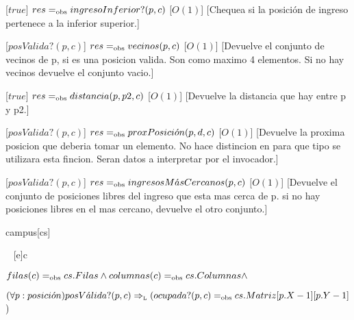 \begin{Interfaz}
  [$true$]
  {$res =_{\mathrm{obs}} ingresoInferior?(p,c)$}
  [$O(1)$]
  [Chequea si la posición de ingreso pertenece a la inferior superior.]
  
  [$posV\acute{a}lida?(p,c)$]
  {$res =_{\mathrm{obs}} vecinos(p,c)$}
  [$O(1)$]
  [Devuelve el conjunto de vecinos de p, si es una posicion valida. Son como maximo 4 elementos. Si no hay vecinos devuelve el conjunto vacio.]
  
  [$true$]
  {$res =_{\mathrm{obs}} distancia(p,p2,c)$}
  [$O(1)$]
  [Devuelve la distancia que hay entre p y p2.]

  [$posV\acute{a}lida?(p,c)$]
  {$res =_{\mathrm{obs}} proxPosici\acute{o}n(p,d,c)$}
  [$O(1)$]
  [Devuelve la proxima posicion que deberia tomar un elemento. No hace distincion en para que tipo se utilizara esta fincion. Seran datos a interpretar por el invocador.]
  
  [$posV\acute{a}lida?(p,c)$]
  {$res =_{\mathrm{obs}} ingresosM\acute{a}sCercanos(p,c)$}
  [$O(1)$]
  [Devuelve el conjunto de posiciones libres del ingreso que esta mas cerca de p. si no hay posiciones libres en el mas cercano, devuelve el otro conjunto.]

\end{Interfaz}

\begin{Representacion}


  \begin{Estructura}{campus}[cs]
    \begin{Tupla}[cs]
    \end{Tupla}
  \end{Estructura}

  \mbox{}
  ~
  [e]{c}{$filas(c) =_{\mathrm{obs}} cs.Filas \land columnas(c) =_{\mathrm{obs}} cs.Columnas \land$  
   \par$(\forall p: posici\acute{o}n) posV\acute{a}lida?(p,c) \Rightarrow_{\mathrm{\scriptscriptstyle{L}}} (ocupada?(p,c) =_{\mathrm{obs}} cs.Matriz[p.X-1][p.Y-1]$)}
\end{Representacion}
 
